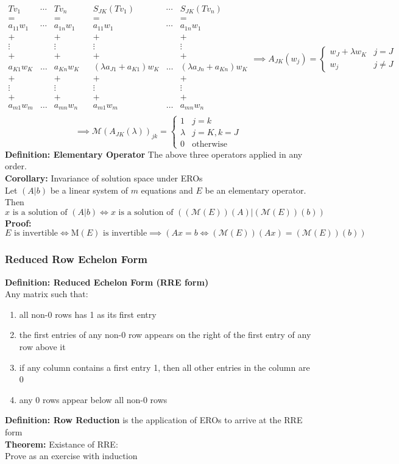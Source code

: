 \documentclass{article}
\newcommand{\0}{{\bf{0}}}
\begin{document}
$$\begin{matrix}
    Tv_1&\cdots&Tv_n&&S_{JK}(Tv_1)&\cdots&S_{JK}(Tv_n)\\
    =&&=&&=&&=\\
    a_{11}w_1&\cdots&a_{1n}w_1&&a_{11}w_1&\cdots&a_{1n}w_1\\
    +&&+&&+&&+\\
    \vdots&&\vdots&&\vdots&&\vdots\\
    +&&+&&+&&+\\
    a_{K1}w_K&\dots&a_{Kn}w_K&&(\lambda a_{J1}+a_{K1})w_K&\dots&(\lambda a_{Jn}+a_{Kn})w_K\\
    +&&+&&+&&+\\
    \vdots&&\vdots&&\vdots&&\vdots\\
    +&&+&&+&&+\\
    a_{m1}w_m&\dots&a_{mn}w_n&&a_{m1}w_m&\dots&a_{mn}w_n\\
\end{matrix}\implies A_{JK}(w_j)=\begin{cases}
    w_J+\lambda w_K&j=J\\
    w_j&j\neq J
\end{cases}$$
$$\implies\mathcal{M}(A_{JK}(\lambda))_{jk}=\begin{cases}
    1&j=k\\
    \lambda&j=K,k=J\\
    0&\mbox{otherwise}
\end{cases}$$
\textbf{Definition: Elementary Operator} The above three operators applied in any order.\\
\textbf{Corollary:} Invariance of solution space under EROs\\
Let $(A|b)$ be a linear system of $m$ equations and $E$ be an elementary operator. Then 
$$x\mbox{ is a solution of }(A|b)\iff x\mbox{ is a solution of }((\mathcal{M}(E))(A)|(\mathcal{M}(E))(b))$$
\textbf{Proof:}
$$E\mbox{ is invertible}\iff\mbox{M}(E)\mbox{ is invertible}\implies (Ax=b\iff(\mathcal{M}(E))(Ax)=(\mathcal{M}(E))(b))$$
\subsubsection{Reduced Row Echelon Form}
\textbf{Definition: Reduced Echelon Form (RRE form)}\\
Any matrix such that:
\begin{enumerate}
    \item all non-0 rows has 1 as its first entry
    \item the first entries of any non-0 row appears on the right of the first entry of any row above it
    \item if any column contains a first entry 1, then all other entries in the column are 0
    \item any 0 rows appear below all non-0 rows
\end{enumerate}
\textbf{Definition: Row Reduction} is the application of EROs to arrive at the RRE form\\
\textbf{Theorem:} Existance of RRE:\\
\null\hfill{Prove as an exercise with induction}
\end{document}
